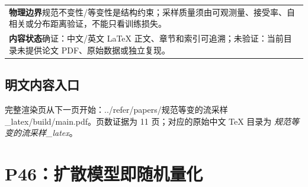 \documentclass[UTF8,11pt,oneside]{ctexbook}
\begin{document}
\begin{table}[htbp]
\begin{tabular}{@{}p{}@{}}
    \textbf{物理边界}\quad 规范不变性/等变性是结构约束；采样质量须由可观测量、接受率、自相关或分布距离验证，不能只看训练损失。 \\
    \textbf{内容状态}\quad 确证：中文/英文 LaTeX 正文、章节和索引可追溯；未验证：当前目录未提供论文 PDF、原始数据或独立复现。 \\
    \bottomrule
  \end{tabular}
\end{table}
\section*{明文内容入口}
\noindent 完整渲染页从下一页开始：../\allowbreak{}refer/\allowbreak{}papers/\allowbreak{}规范等变的流采样\_\allowbreak{}latex/\allowbreak{}build/\allowbreak{}main.pdf。页数证据为 11 页；对应的原始中文 TeX 目录为 \emph{规范等变的流采样\_latex}。
\clearpage

\clearpage

\chapter{P46：扩散模型即随机量化}
\end{document}
